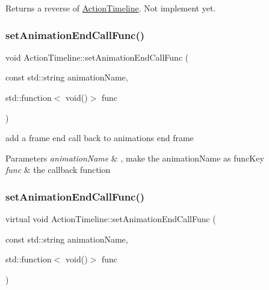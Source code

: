 Returns a reverse of \hyperlink{classActionTimeline}{Action\+Timeline}. Not implement yet. \mbox{\label{classActionTimeline_a12de94ac001f47cbc17fb0f58a093978}} 
\subsubsection{\texorpdfstring{set\+Animation\+End\+Call\+Func()}{setAnimationEndCallFunc()}\hspace{0.1cm}{\footnotesize\ttfamily [1/2]}}
{\footnotesize\ttfamily void Action\+Timeline\+::set\+Animation\+End\+Call\+Func (\begin{DoxyParamCaption}\item[{const std\+::string}]{animation\+Name,  }\item[{std\+::function$<$ void()$>$}]{func }\end{DoxyParamCaption})\hspace{0.3cm}{\ttfamily [virtual]}}

add a frame end call back to animation\textquotesingle{}s end frame 
\begin{DoxyParams}{Parameters}
{\em animation\+Name} & , make the animation\+Name as func\+Key \\
\hline
{\em func} & the callback function \\
\hline
\end{DoxyParams}
\mbox{\label{classActionTimeline_a9622a091358533cd1ea7fdbe20a81005}} 
\subsubsection{\texorpdfstring{set\+Animation\+End\+Call\+Func()}{setAnimationEndCallFunc()}\hspace{0.1cm}{\footnotesize\ttfamily [2/2]}}
{\footnotesize\ttfamily virtual void Action\+Timeline\+::set\+Animation\+End\+Call\+Func (\begin{DoxyParamCaption}\item[{const std\+::string}]{animation\+Name,  }\item[{std\+::function$<$ void()$>$}]{func }\end{DoxyParamCaption})\hspace{0.3cm}{\ttfamily [virtual]}}

